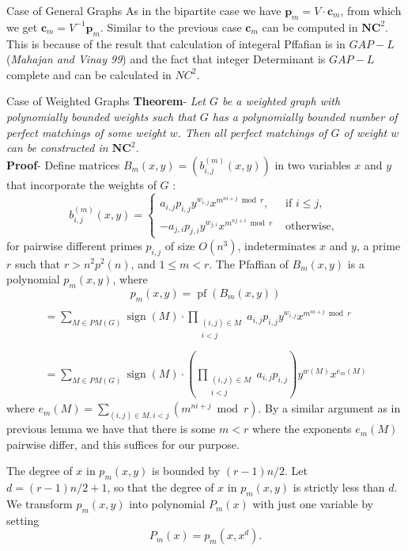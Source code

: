 \documentclass{beamer}
\begin{document}
\begin{frame}[allowframebreaks]{Case of General Graphs }
	As in the bipartite case we have $\boldsymbol{p}_m=V \cdot \boldsymbol{c}_m$, from which we get $\boldsymbol{c}_m=V^{-1} \boldsymbol{p}_m$. Similar to the previous case $ \boldsymbol{c}_m$ can be computed in $\mathbf{N C}^2$.
	\\
	This is because of the result that calculation of integeral Pffafian is in $GAP-L$ (\textit{Mahajan and Vinay 99}) and the fact that integer Determinant is $GAP-L$ complete and can be calculated in $NC^2$.
\end{frame}
\begin{frame}[allowframebreaks]{Case of Weighted Graphs}
	\textbf{Theorem}- \textit{Let $G$ be a weighted graph with polynomially bounded weights such that $G$ has a polynomially bounded number of perfect matchings of some weight $w$. Then all perfect matchings of $G$ of weight $w$ can be constructed in $\mathbf{N C}^2$.} \\
	\textbf{Proof}- 
	Define matrices $B_m(x, y)=\left(b_{i, j}^{(m)}(x, y)\right)$ in two variables $x$ and $y$ that incorporate the weights of $G$ :
	$$
	b_{i, j}^{(m)}(x, y)= \begin{cases}a_{i, j} p_{i, j} y^{w_{i, j}} x^{m^{n i+j} \bmod r}, & \text { if } i \leq j, \\ -a_{j, i} p_{j, i} y^{w_{j, i}} x^{m^{n j+i} \bmod r}  & \text { otherwise, }\end{cases}
	$$
	for pairwise different primes $p_{i, j}$ of size $O\left(n^3\right)$, indeterminates $x$ and $y$, a prime $r$ such that $r>n^2 p^2(n)$, and $1 \leq m<r$.
	The Pfaffian of $B_m(x, y)$ is a polynomial $p_m(x, y)$, where $$p_m(x, y)=\operatorname{pf}\left(B_m(x, y)\right) $$
	$$
	\begin{aligned}
		\\ =\sum_{M \in P M(G)} \operatorname{sign}(M) \cdot \prod_{\substack{(i, j) \in M \\
				i<j}} a_{i, j} p_{i, j} y^{w_{i, j}} x^{m^{n i+j} \bmod r} \\
		\\ =\sum_{M \in P M(G)} \operatorname{sign}(M) \cdot\left(\prod_{\substack{(i, j) \in M \\
				i<j}} a_{i, j} p_{i, j}\right) y^{w(M)} x^{e_m(M)}
	\end{aligned}
	$$
	where $e_m(M)=\sum_{(i, j) \in M,i<j}\left(m^{n i+j} \bmod r\right)$. By a similar argument as in previous lemma 
	we have that there is some $m<r$ where the exponents $e_m(M)$ pairwise differ, and this suffices for our purpose.
	
	The degree of $x$ in $p_m(x, y)$ is bounded by $(r-1) n / 2$. Let $d=(r-1) n / 2+1$, so that the degree of $x$ in $p_m(x, y)$ is strictly less than $d$. We transform $p_m(x, y)$ into polynomial $P_m(x)$ with just one variable by setting
	$$
	P_m(x)=p_m\left(x, x^d\right) .
	$$
	

\end{frame}
\end{document}
